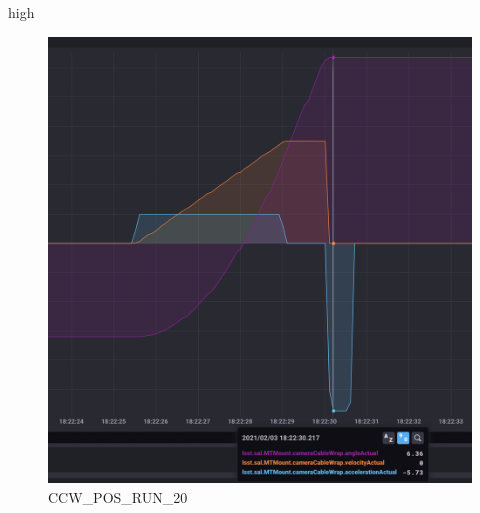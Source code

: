 high\documentclass[SE,lsstdraft,authoryear,toc]{lsstdoc}
\begin{document}
\begin{figure}[h!]
  \includegraphics[width=\linewidth]{media/CCW_design_speed_pos_test20.png}
  \caption{CCW\_POS\_RUN\_20}
  \label{fig:CCW_POS_RUN_20}
\end{figure}
\end{document}
